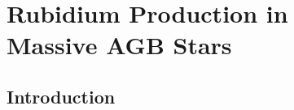 \chapter[Rubidium Production in Massive AGB Stars]{\textbf{Rubidium Production in \\ Massive AGB Stars}}
\label{ch:Rb}



\section{Introduction}


